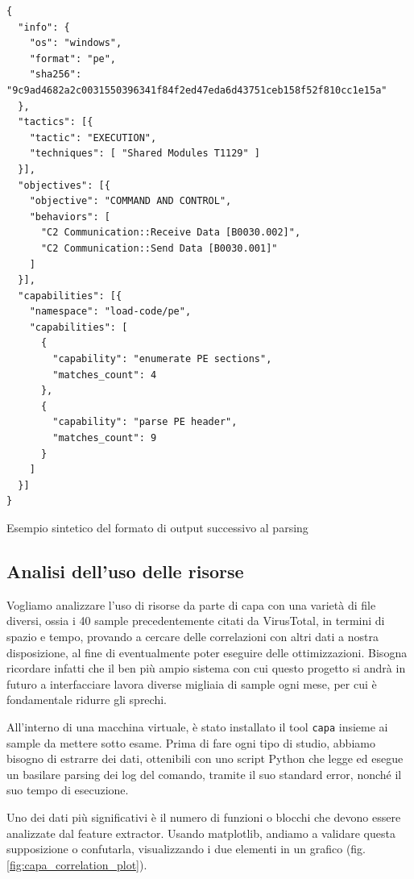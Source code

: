 \begin{code}
\begin{verbatim}
{
  "info": {
    "os": "windows",
    "format": "pe",
    "sha256": "9c9ad4682a2c0031550396341f84f2ed47eda6d43751ceb158f52f810cc1e15a"
  },
  "tactics": [{
    "tactic": "EXECUTION",
    "techniques": [ "Shared Modules T1129" ]
  }],
  "objectives": [{
    "objective": "COMMAND AND CONTROL",
    "behaviors": [
      "C2 Communication::Receive Data [B0030.002]",
      "C2 Communication::Send Data [B0030.001]"
    ]
  }],
  "capabilities": [{
    "namespace": "load-code/pe",
    "capabilities": [
      {
        "capability": "enumerate PE sections",
        "matches_count": 4
      },
      {
        "capability": "parse PE header",
        "matches_count": 9
      }
    ]
  }]
}
\end{verbatim}
\caption{Esempio sintetico del formato di output successivo al parsing}
\end{code}

\subsection{Analisi dell'uso delle risorse}
Vogliamo analizzare l'uso di risorse da parte di capa con una varietà di file diversi, ossia i 40 sample precedentemente citati da VirusTotal, in termini di spazio e tempo, provando a cercare delle correlazioni con altri dati a nostra disposizione, al fine di eventualmente poter eseguire delle ottimizzazioni.
Bisogna ricordare infatti che il ben più ampio sistema con cui questo progetto si andrà in futuro a interfacciare lavora diverse migliaia di sample ogni mese, per cui è fondamentale ridurre gli sprechi.

All'interno di una macchina virtuale, è stato installato il tool \texttt{capa} insieme ai sample da mettere sotto esame.
Prima di fare ogni tipo di studio, abbiamo bisogno di estrarre dei dati, ottenibili con uno script Python che legge ed esegue un basilare parsing dei log del comando, tramite il suo standard error, nonché il suo tempo di esecuzione.

Uno dei dati più significativi è il numero di funzioni o blocchi che devono essere analizzate dal feature extractor.
Usando matplotlib, andiamo a validare questa supposizione o confutarla, visualizzando i due elementi in un grafico (fig. \ref{fig:capa_correlation_plot}).

